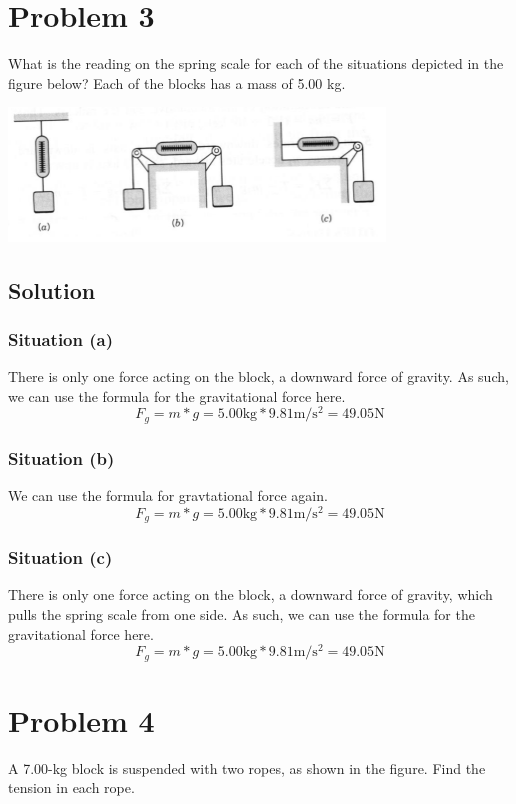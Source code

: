 \documentclass[12pt]{article}
\begin{document}
\pagebreak
\section*{Problem 3}
What is the reading on the spring scale for each of the situations depicted in the figure below? Each of the blocks has a mass of 5.00 kg.

\begin{center}
    \includegraphics*[width=10cm]{graph_3.png}
\end{center}

\subsection*{Solution}
\subsubsection*{Situation (a)}
There is only one force acting on the block, a downward force of gravity. As such, we can use the formula for the gravitational force here.
\[ 
    F_g = m*g 
        = 5.00 \unit{\kilo\gram} * 9.81\unit{\meter/\second^2}
        = \boxed{ 49.05 \unit{\newton} }
\]

\subsubsection*{Situation (b)}
We can use the formula for gravtational force again.
\[ 
    F_g = m*g
        = 5.00 \unit{\kilo\gram} * 9.81\unit{\meter/\second^2}
        = \boxed{ 49.05 \unit{\newton} }
\]

\subsubsection*{Situation (c)}
There is only one force acting on the block, a downward force of gravity, which pulls the spring scale from one side. As such, we can use the formula for the gravitational force here.
\[ 
    F_g = m*g 
        = 5.00 \unit{\kilo\gram} * 9.81\unit{\meter/\second^2}
        = \boxed{ 49.05 \unit{\newton} }
\]

\pagebreak
\section*{Problem 4}
A 7.00-kg block is suspended with two ropes, as shown in the figure. Find the tension in each rope.
\end{document}
